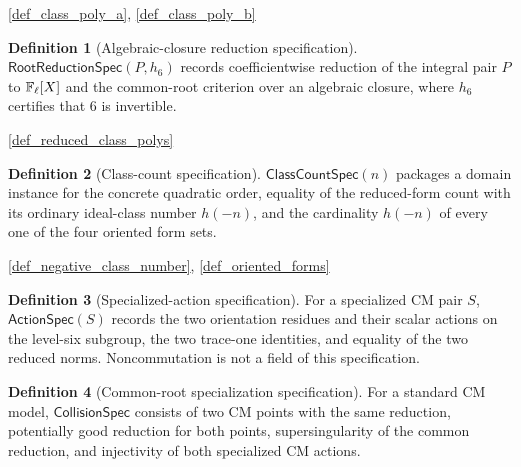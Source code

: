 \documentclass[11pt,a4paper]{article}
\numberwithin{equation}{section}
\theoremstyle{plain}\newtheorem{theorem}{Theorem}[section]\newaliascnt{proposition}{theorem}\newtheorem{proposition}[proposition]{Proposition}\aliascntresetthe{proposition}\newaliascnt{lemma}{theorem}\newtheorem{lemma}[lemma]{Lemma}\aliascntresetthe{lemma}
\theoremstyle{definition}\newaliascnt{definition}{theorem}\newtheorem{definition}[definition]{Definition}\aliascntresetthe{definition}\newaliascnt{notation}{theorem}\newtheorem{notation}[notation]{Notation}\aliascntresetthe{notation}
\providecommand{\lean}[1]{}\providecommand{\leanok}{}
\begin{document}
\begin{uses-statement}\ref{def_class_poly_a}, \ref{def_class_poly_b}\end{uses-statement}
\begin{definition}[Algebraic-closure reduction specification]\label{def_root_reduction_spec}\lean{SptCM.Repair.RootReductionSpec}\leanok
$\mathsf{RootReductionSpec}(P,h_6)$ records coefficientwise reduction of
the integral pair $P$ to $\mathbb F_\ell[X]$ and the common-root criterion over an
algebraic closure, where $h_6$ certifies that $6$ is invertible.
\end{definition}
\begin{uses-statement}\ref{def_reduced_class_polys}\end{uses-statement}
\begin{definition}[Class-count specification]\label{def_class_count_spec}\lean{SptCM.Arithmetic.Repaired.ClassCountSpec}\leanok
$\mathsf{ClassCountSpec}(n)$ packages a domain instance for the concrete
quadratic order, equality of the reduced-form count with its ordinary
ideal-class number $h(-n)$, and the cardinality $h(-n)$ of every one of the
four oriented form sets.
\end{definition}
\begin{uses-statement}\ref{def_negative_class_number}, \ref{def_oriented_forms}\end{uses-statement}
\begin{definition}[Specialized-action specification]\label{def_action_spec}\lean{SptCM.Repair.OrientedSpecializedActions}\leanok
For a specialized CM pair $S$, $\mathsf{ActionSpec}(S)$ records the two
orientation residues and their scalar actions on the level-six subgroup,
the two trace-one identities, and equality of the two reduced norms.
Noncommutation is not a field of this specification.
\end{definition}
\begin{definition}[Common-root specialization specification]\label{def_collision_spec}\lean{SptCM.Repair.GeometricCMSpecialization}\leanok
For a standard CM model, $\mathsf{CollisionSpec}$ consists of two CM points
with the same reduction, potentially good reduction for both points,
supersingularity of the common reduction, and injectivity of both specialized
CM actions.
\end{definition}
\end{document}
